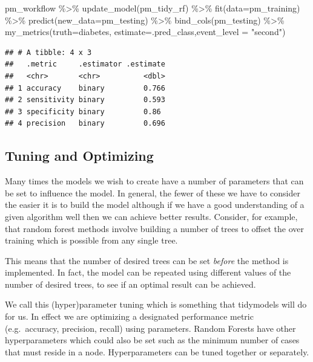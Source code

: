 \documentclass[
]{article}
\newenvironment{Shaded}{\begin{snugshade}}{\end{snugshade}}
\newcommand{\AttributeTok}[1]{\textcolor[rgb]{0.77,0.63,0.00}{#1}}
\newcommand{\FunctionTok}[1]{\textcolor[rgb]{0.00,0.00,0.00}{#1}}
\newcommand{\NormalTok}[1]{#1}
\newcommand{\SpecialCharTok}[1]{\textcolor[rgb]{0.00,0.00,0.00}{#1}}
\newcommand{\StringTok}[1]{\textcolor[rgb]{0.31,0.60,0.02}{#1}}
\begin{document}
\begin{Shaded}
\begin{Highlighting}[]
\NormalTok{pm\_workflow }\SpecialCharTok{\%\textgreater{}\%}
  \FunctionTok{update\_model}\NormalTok{(pm\_tidy\_rf) }\SpecialCharTok{\%\textgreater{}\%}
  \FunctionTok{fit}\NormalTok{(}\AttributeTok{data=}\NormalTok{pm\_training) }\SpecialCharTok{\%\textgreater{}\%}
  \FunctionTok{predict}\NormalTok{(}\AttributeTok{new\_data=}\NormalTok{pm\_testing) }\SpecialCharTok{\%\textgreater{}\%}
  \FunctionTok{bind\_cols}\NormalTok{(pm\_testing) }\SpecialCharTok{\%\textgreater{}\%}
  \FunctionTok{my\_metrics}\NormalTok{(}\AttributeTok{truth=}\NormalTok{diabetes, }\AttributeTok{estimate=}\NormalTok{.pred\_class,}\AttributeTok{event\_level =} \StringTok{"second"}\NormalTok{)}
\end{Highlighting}
\end{Shaded}

\begin{verbatim}
## # A tibble: 4 x 3
##   .metric     .estimator .estimate
##   <chr>       <chr>          <dbl>
## 1 accuracy    binary         0.766
## 2 sensitivity binary         0.593
## 3 specificity binary         0.86 
## 4 precision   binary         0.696
\end{verbatim}

\hypertarget{tuning-and-optimizing}{%
\subsection{Tuning and Optimizing}\label{tuning-and-optimizing}}

Many times the models we wish to create have a number of parameters that
can be set to influence the model. In general, the fewer of these we
have to consider the easier it is to build the model although if we have
a good understanding of a given algorithm well then we can achieve
better results. Consider, for example, that random forest methods
involve building a number of trees to offset the over training which is
possible from any single tree.

This means that the number of desired trees can be set \emph{before} the
method is implemented. In fact, the model can be repeated using
different values of the number of desired trees, to see if an optimal
result can be achieved.

We call this (hyper)parameter tuning which is something that tidymodels
will do for us. In effect we are optimizing a designated performance
metric (e.g.~accuracy, precision, recall) using parameters. Random
Forests have other hyperparameters which could also be set such as the
minimum number of cases that must reside in a node. Hyperparameters can
be tuned together or separately.
\end{document}
